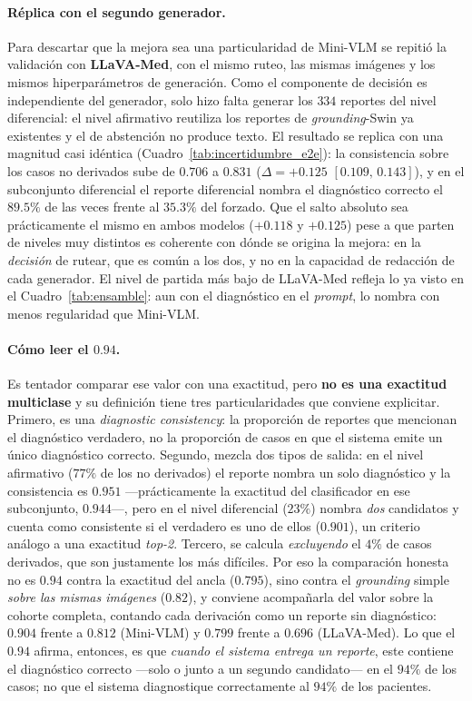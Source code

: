 \documentclass[11pt, a4paper]{article}
\begin{document}
\paragraph{Réplica con el segundo generador.} Para descartar que la mejora sea una particularidad de
Mini-VLM se repitió la validación con \textbf{LLaVA-Med}, con el mismo ruteo, las mismas imágenes y los
mismos hiperparámetros de generación. Como el componente de decisión es independiente del generador, solo
hizo falta generar los $334$ reportes del nivel diferencial: el nivel afirmativo reutiliza los reportes de
\emph{grounding}-Swin ya existentes y el de abstención no produce texto. El resultado se replica con una
magnitud casi idéntica (Cuadro~\ref{tab:incertidumbre_e2e}): la consistencia sobre los casos no derivados
sube de $0.706$ a $0.831$ ($\Delta=+0.125$ $[0.109,\,0.143]$), y en el subconjunto diferencial el reporte
diferencial nombra el diagnóstico correcto el $89.5\%$ de las veces frente al $35.3\%$ del forzado. Que el
salto absoluto sea prácticamente el mismo en ambos modelos ($+0.118$ y $+0.125$) pese a que parten de niveles
muy distintos es coherente con dónde se origina la mejora: en la \emph{decisión} de rutear, que es común a
los dos, y no en la capacidad de redacción de cada generador. El nivel de partida más bajo de LLaVA-Med
refleja lo ya visto en el Cuadro~\ref{tab:ensamble}: aun con el diagnóstico en el \emph{prompt}, lo nombra
con menos regularidad que Mini-VLM.

\paragraph{Cómo leer el $0.94$.} Es tentador comparar ese valor con una exactitud, pero \textbf{no es una
exactitud multiclase} y su definición tiene tres particularidades que conviene explicitar. Primero, es una
\emph{diagnostic consistency}: la proporción de reportes que mencionan el diagnóstico verdadero, no la
proporción de casos en que el sistema emite un único diagnóstico correcto. Segundo, mezcla dos tipos de
salida: en el nivel afirmativo ($77\%$ de los no derivados) el reporte nombra un solo diagnóstico y la
consistencia es $0.951$ —prácticamente la exactitud del clasificador en ese subconjunto, $0.944$—, pero en
el nivel diferencial ($23\%$) nombra \emph{dos} candidatos y cuenta como consistente si el verdadero es uno
de ellos ($0.901$), un criterio análogo a una exactitud \emph{top-2}. Tercero, se calcula \emph{excluyendo}
el $4\%$ de casos derivados, que son justamente los más difíciles. Por eso la comparación honesta no es
$0.94$ contra la exactitud del ancla ($0.795$), sino contra el \emph{grounding} simple \emph{sobre las mismas
imágenes} ($0.82$), y conviene acompañarla del valor sobre la cohorte completa, contando cada derivación
como un reporte sin diagnóstico: $\mathbf{0.904}$ frente a $0.812$ (Mini-VLM) y $0.799$ frente a $0.696$
(LLaVA-Med). Lo que el $0.94$ afirma, entonces, es que \emph{cuando el sistema entrega un reporte}, este
contiene el diagnóstico correcto —solo o junto a un segundo candidato— en el $94\%$ de los casos; no que
el sistema diagnostique correctamente al $94\%$ de los pacientes.
\end{document}
